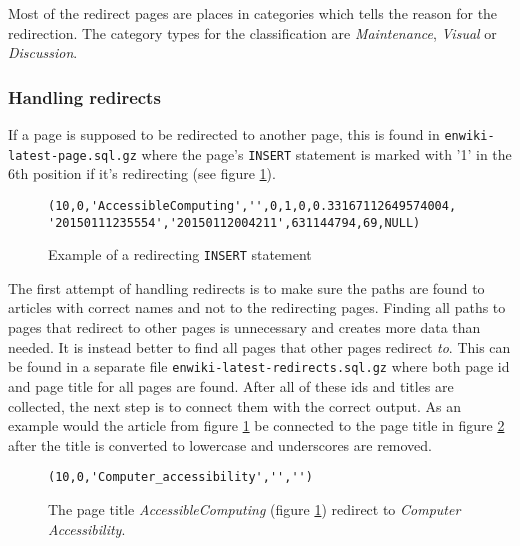 Most of the redirect pages are places in categories which tells the reason for the redirection. The category types for the classification are \emph{Maintenance}, \emph{Visual} or \emph{Discussion}.

\subsubsection{Handling redirects}

If a page is supposed to be redirected to another page, this is found in \texttt{enwiki- latest-page.sql.gz} where the page's \texttt{INSERT} statement is marked with '1' in the 6th position if it's redirecting (see figure \ref{fig:isredirect}).

\begin{figure}[h]
\centering
\begin{lstlisting}
(10,0,'AccessibleComputing','',0,1,0,0.33167112649574004,
'20150111235554','20150112004211',631144794,69,NULL)
\end{lstlisting}
\caption{Example of a redirecting \texttt{INSERT} statement}
\label{fig:isredirect}
\end{figure}
The first attempt of handling redirects is to make sure the paths are found to articles with correct names and not to the redirecting pages. Finding all paths to pages that redirect to other pages is unnecessary and creates more data than needed. It is instead better to find all pages that other pages redirect \emph{to}. This can be found in a separate file \texttt{enwiki-latest-redirects.sql.gz} where both page id and page title for all pages are found. After all of these ids and titles are collected, the next step is to connect them with the correct output. As an example would the article from figure \ref{fig:isredirect} be connected to the page title in figure \ref{fig:correctacccomp} after the title is converted to lowercase and underscores are removed. 

\begin{figure}[h]
\centering
\begin{lstlisting}
(10,0,'Computer_accessibility','','')
\end{lstlisting}
\caption[Example of a page redirecting to]{The page title \emph{AccessibleComputing} (figure \ref{fig:isredirect}) redirect to \emph{Computer Accessibility}.}
\label{fig:correctacccomp}
\end{figure}



